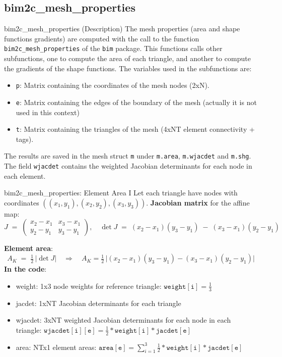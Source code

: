 \documentclass[aspectratio=54,xcolor=dvipsnames]{beamer}
\begin{document}
\subsection{bim2c\_mesh\_properties}
\begin{frame}{bim2c\_mesh\_properties (Description)}
    The mesh properties (area and shape functions gradients) are computed with the call to the function \texttt{bim2c\_mesh\_properties} of the \texttt{bim} package. This functions calls other subfunctions, one to compute the area of each triangle, and another to compute the gradients of the shape functions.
    The variables used in the subfunctions are:
    \begin{itemize}
        \item \texttt{p}: Matrix containing the coordinates of the mesh nodes (2xN).
        \item \texttt{e}: Matrix containing the edges of the boundary of the mesh (actually it is not used in this context)
        \item \texttt{t}: Matrix containing the triangles of the mesh (4xNT element connectivity + tags).
    \end{itemize}
    The results are saved in the mesh struct \texttt{m} under \texttt{m.area}, \texttt{m.wjacdet} and \texttt{m.shg}. The field \texttt{wjacdet} contains the weighted Jacobian determinants for each node in each element.
\end{frame}

\begin{frame}{bim2c\_mesh\_properties: Element Area I}
\small
Let each triangle have nodes with coordinates $((x_1,y_1), (x_2,y_2), (x_3,y_3))$.
\textbf{Jacobian matrix} for the affine map:
\[
    J \;=\;
    \begin{pmatrix}
        x_2 - x_1 & x_3 - x_1 \\[3pt]
        y_2 - y_1 & y_3 - y_1
    \end{pmatrix},
    \quad
    \det J \;=\;(x_2 - x_1)(y_3 - y_1)\;-\;(x_3 - x_1)(y_2 - y_1)
\]

\textbf{Element area}:
\[
    A_K \;=\;\tfrac12\,|\det J|
    \quad\Longrightarrow\quad
    A_K = \tfrac12\,\bigl|(x_2-x_1)(y_3-y_1)-(x_3-x_1)(y_2-y_1)\bigr|
\]
\textbf{In the code}:
\begin{itemize}
    \item weight: 1x3 node weights for reference triangle: $\mathtt{weight[i]} = \tfrac13$ 
    \item jacdet: 1xNT Jacobian determinants for each triangle
    \item wjacdet: 3xNT weighted Jacobian determinants for each node in each triangle: $\mathtt{wjacdet[i][e]} = \tfrac12 * \mathtt{weight[i]} * \mathtt{jacdet[e]}$ 
    \item area: NTx1 element areas: $\mathtt{area[e]} = \sum_{i=1}^{3} \tfrac12 * \mathtt{weight[i]} * \mathtt{jacdet[e]}$
\end{itemize}
\end{frame}
\end{document}
